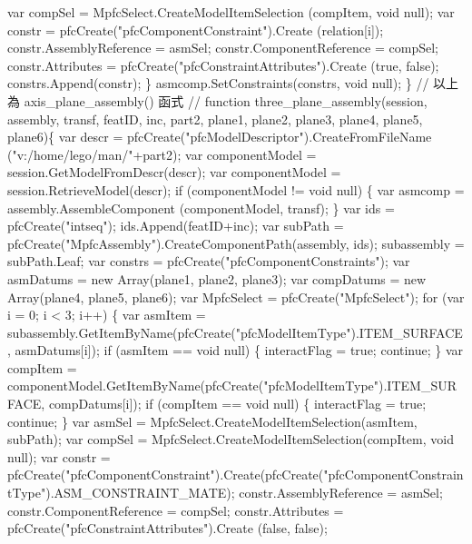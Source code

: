 \documentclass[]{article}
\newenvironment{Shaded}{}{}
\newcommand{\StringTok}[1]{\textcolor[rgb]{0.25,0.44,0.63}{{#1}}}
\begin{document}
\begin{Shaded}
\begin{Highlighting}[]
\StringTok{        var compSel = MpfcSelect.CreateModelItemSelection (compItem, void null);}
\StringTok{        var constr = pfcCreate("pfcComponentConstraint").Create (relation[i]);}
\StringTok{        constr.AssemblyReference  = asmSel;}
\StringTok{        constr.ComponentReference = compSel;}
\StringTok{        constr.Attributes = pfcCreate("pfcConstraintAttributes").Create (true, false);}
\StringTok{        constrs.Append(constr);}
\StringTok{    \}}
\StringTok{asmcomp.SetConstraints(constrs, void null);}
\StringTok{\}}
\StringTok{// 以上為 axis_plane_assembly() 函式}
\StringTok{//}
\StringTok{function three_plane_assembly(session, assembly, transf, featID, inc, part2, plane1, plane2, plane3, plane4, plane5, plane6)\{}
\StringTok{var descr = pfcCreate("pfcModelDescriptor").CreateFromFileName ("v:/home/lego/man/"+part2);}
\StringTok{var componentModel = session.GetModelFromDescr(descr);}
\StringTok{var componentModel = session.RetrieveModel(descr);}
\StringTok{if (componentModel != void null)}
\StringTok{\{}
\StringTok{    var asmcomp = assembly.AssembleComponent (componentModel, transf);}
\StringTok{\}}
\StringTok{var ids = pfcCreate("intseq");}
\StringTok{ids.Append(featID+inc);}
\StringTok{var subPath = pfcCreate("MpfcAssembly").CreateComponentPath(assembly, ids);}
\StringTok{subassembly = subPath.Leaf;}
\StringTok{var constrs = pfcCreate("pfcComponentConstraints");}
\StringTok{var asmDatums = new Array(plane1, plane2, plane3);}
\StringTok{var compDatums = new Array(plane4, plane5, plane6);}
\StringTok{var MpfcSelect = pfcCreate("MpfcSelect");}
\StringTok{for (var i = 0; i < 3; i++)}
\StringTok{\{}
\StringTok{    var asmItem = subassembly.GetItemByName(pfcCreate("pfcModelItemType").ITEM_SURFACE, asmDatums[i]);}
\StringTok{    }
\StringTok{    if (asmItem == void null)}
\StringTok{    \{}
\StringTok{        interactFlag = true;}
\StringTok{        continue;}
\StringTok{    \}}
\StringTok{    var compItem = componentModel.GetItemByName(pfcCreate("pfcModelItemType").ITEM_SURFACE, compDatums[i]);}
\StringTok{    if (compItem == void null)}
\StringTok{    \{}
\StringTok{        interactFlag = true;}
\StringTok{        continue;}
\StringTok{    \}}
\StringTok{    var asmSel = MpfcSelect.CreateModelItemSelection(asmItem, subPath);}
\StringTok{    var compSel = MpfcSelect.CreateModelItemSelection(compItem, void null);}
\StringTok{    var constr = pfcCreate("pfcComponentConstraint").Create(pfcCreate("pfcComponentConstraintType").ASM_CONSTRAINT_MATE);}
\StringTok{    constr.AssemblyReference = asmSel;}
\StringTok{    constr.ComponentReference = compSel;}
\StringTok{    constr.Attributes = pfcCreate("pfcConstraintAttributes").Create (false, false);}

\end{Highlighting}
\end{Shaded}
\end{document}
